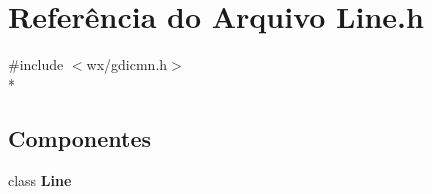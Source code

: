 \section{Referência do Arquivo Line.\+h}
\label{_line_8h}
{\ttfamily \#include $<$wx/gdicmn.\+h$>$}\\*
\subsection*{Componentes}
\begin{DoxyCompactItemize}
\item 
class {\bf Line}
\end{DoxyCompactItemize}
